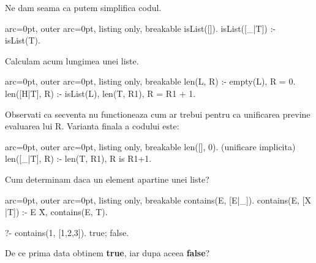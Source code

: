 Ne dam seama ca putem simplifica codul.

\begin{tcblisting}{ arc=0pt, outer arc=0pt, listing only, breakable}
isList([]).
isList([_|T]) :- isList(T).

\end{tcblisting}


Calculam acum lungimea unei liste.

\begin{tcblisting}{ arc=0pt, outer arc=0pt, listing only, breakable}
len(L, R) :- empty(L), R = 0.
len([H|T], R) :- isList(L), len(T, R1), R = R1 + 1.

\end{tcblisting}

Observati ca secventa nu functioneaza cum ar trebui pentru ca unificarea previne evaluarea lui R. Varianta finala a codului este:


\begin{tcblisting}{ arc=0pt, outer arc=0pt, listing only, breakable}
len([], 0). (unificare implicita)
len([_|T], R) :- len(T, R1), R is R1+1.

\end{tcblisting}


Cum determinam daca un element apartine unei liste?

\begin{tcblisting}{ arc=0pt, outer arc=0pt, listing only, breakable}
contains(E, [E|_]).
contains(E, [X |T]) :- E \= X, contains(E, T). 

?- contains(1, [1,2,3]).
true;
false.

\end{tcblisting}

De ce prima data obtinem \textbf{true}, iar dupa aceea \textbf{false}?
